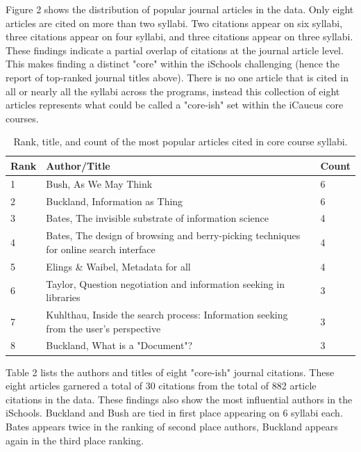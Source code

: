 \documentclass[10pt, letterpaper]{article}
\begin{document}
Figure 2 shows the distribution of popular journal articles in the data. Only eight articles are cited on more than two syllabi. Two citations appear on six syllabi, three citations appear on four syllabi, and three citations appear on three syllabi. These findings indicate a partial overlap of citations at the journal article level. This makes finding a distinct "core" within the iSchools challenging (hence the report of top-ranked journal titles above). There is no one article that is cited in all or nearly all the syllabi across the programs, instead this collection of eight articles represents what could be called a "core-ish" set within the iCaucus core courses. 

\begin{table}[h]

\begin{tabular}{lll} 
\toprule
Rank & Author/Title & Count \\
\midrule
1 & Bush, As We May Think & 6 \\
2 & Buckland, Information as Thing & 6 \\
3 & Bates, The invisible substrate of information science & 4\\
4 & Bates, The design of browsing and berry-picking techniques for online search interface & 4 \\
5 & Elings \& Waibel, Metadata for all & 4 \\
6 & Taylor, Question negotiation and information seeking in libraries & 3 \\
7 & Kuhlthau, Inside the search process: Information seeking from the user's perspective & 3 \\
8 & Buckland, What is a "Document"? & 3 \\
\bottomrule
\end{tabular}
\caption{Rank, title, and count of the most popular articles cited in core course syllabi.} 
\end{table}

Table 2 lists the authors and titles of eight "core-ish" journal citations. These eight articles garnered a total of 30 citations from the total of 882 article citations in the data. These findings also show the most influential authors in the iSchools. Buckland and Bush are tied in first place appearing on 6 syllabi each. Bates appears twice in the ranking of second place authors, Buckland appears again in the third place ranking.
\end{document}
